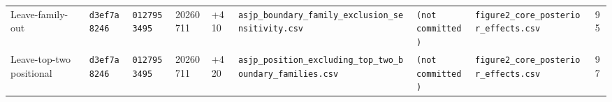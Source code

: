 \begin{table}[htbp]
{\begin{tabular}{l l l l l l l l c}
Leave-family-out & \texttt{d3ef7a8246} & \texttt{0127953495} & 20260711 & +410 & \texttt{asjp\_boundary\_family\_exclusion\_sensitivity.csv} & \texttt{(not committed)} & \texttt{figure2\_core\_posterior\_effects.csv} & 95 \\
Leave-top-two positional & \texttt{d3ef7a8246} & \texttt{0127953495} & 20260711 & +420 & \texttt{asjp\_position\_excluding\_top\_two\_boundary\_families.csv} & \texttt{(not committed)} & \texttt{figure2\_core\_posterior\_effects.csv} & 97 \\
\bottomrule
\end{tabular}
}

\par{}
\end{table}
